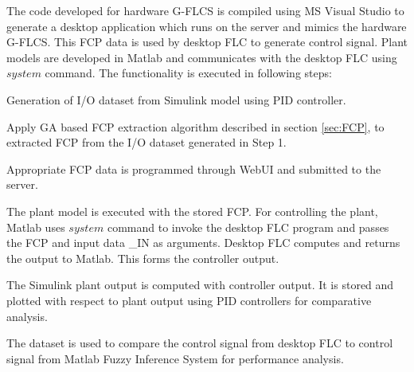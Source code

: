 The code developed for hardware G-FLCS is compiled using MS Visual Studio to generate a desktop application which runs on the server and mimics the hardware G-FLCS. This FCP data is used by desktop FLC to generate control signal. Plant models are developed in Matlab and communicates with the desktop FLC using $ system $ command. The functionality is executed in following steps:
\begin{description}\label{algo:StepsSim}
	\item[Step 1] Generation of I/O dataset from Simulink model using PID controller.
	\item[Step 2] Apply GA based FCP extraction algorithm described in section \ref{sec:FCP}, to extracted FCP from the I/O dataset generated in Step 1. 
	\item[Step 3] Appropriate FCP data is programmed through WebUI and submitted to the server.
	\item[Step 4] The plant model is executed with the stored FCP. For controlling the plant, Matlab uses $ system $ command to invoke the desktop FLC program and passes the FCP and input data \_IN as arguments. Desktop FLC computes and returns the output to Matlab. This forms the controller output.
	\item[Step 5] The Simulink plant output is computed with controller output. It is stored and plotted with respect to plant output using PID controllers for comparative analysis.
	\item[Step 6] The dataset is used to compare the control signal from desktop FLC to control signal from Matlab Fuzzy Inference System for performance analysis.
\end{description}
 
